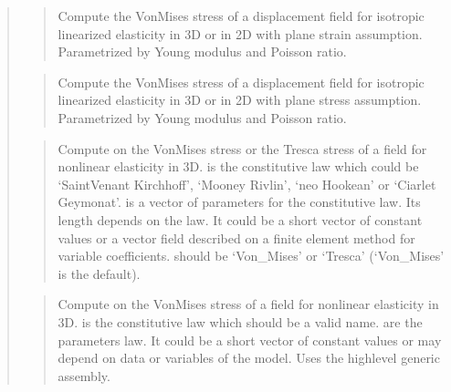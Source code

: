 \documentclass[a4paper,11pt,english]{sphinxmanual}
\begin{document}
\begin{quote}
\begin{quote}

Compute the Von\sphinxhyphen{}Mises stress  of a displacement field for isotropic
linearized elasticity in 3D or in 2D with plane strain assumption.
Parametrized by Young modulus and Poisson ratio.
\end{quote}

\begin{quote}

Compute the Von\sphinxhyphen{}Mises stress  of a displacement field for isotropic
linearized elasticity in 3D or in 2D with plane stress assumption.
Parametrized by Young modulus and Poisson ratio.
\end{quote}

\begin{quote}

Compute on  the Von\sphinxhyphen{}Mises stress or the Tresca stress of a field
for nonlinear elasticity in 3D.  is the constitutive law which
could be ‘SaintVenant Kirchhoff’, ‘Mooney Rivlin’, ‘neo Hookean’ or
‘Ciarlet Geymonat’.
 is a vector of parameters for the constitutive law. Its length
depends on the law. It could be a short vector of constant values or a
vector field described on a finite element method for variable coefficients.
 should be  ‘Von\_Mises’ or ‘Tresca’ (‘Von\_Mises’ is the default).
\end{quote}

\begin{quote}

Compute on  the Von\sphinxhyphen{}Mises stress of a field 
for nonlinear elasticity in 3D.  is the constitutive law which
should be a valid name.  are the parameters law. It could be
a short vector of constant values or may depend on data or variables
of the model.
Uses the high\sphinxhyphen{}level generic assembly.
\end{quote}


\end{quote}
\end{document}
